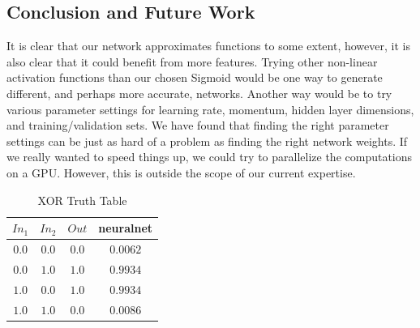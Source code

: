 \documentclass{article}
\begin{document}
\begin{multicols}{2}
\section{Conclusion and Future Work}

It is clear that our network approximates functions to some extent, however, it is also clear that it could benefit from more features. Trying other non-linear activation functions than our chosen Sigmoid would be one way to generate different, and perhaps more accurate, networks. Another way would be to try various parameter settings for learning rate, momentum, hidden layer dimensions, and training/validation sets. We have found that finding the right parameter settings can be just as hard of a problem as finding the right network weights. If we really wanted to speed things up, we could try to parallelize the computations on a GPU. However, this is outside the scope of our current expertise.




\end{multicols}

\begin{table}[ht]
	\caption{XOR Truth Table}
	\label{tab:xortable}
	\begin{center}
		\begin{tabular}{cc|cc}
		\hline
		\hline
		\textbf{$In_1$} & \textbf{$In_2$} & \textbf{$Out$} & neuralnet \\
		\hline
			$0.0$ & $0.0$ & $0.0$ & $0.0062$\\
			$0.0$ & $1.0$ & $1.0$ & $0.9934$\\
			$1.0$ & $0.0$ & $1.0$ & $0.9934$\\
			$1.0$ & $1.0$ & $0.0$ & $0.0086$\\
		\hline

		\hline
		\end{tabular}
	\end{center}
\end{table}
\end{document}

